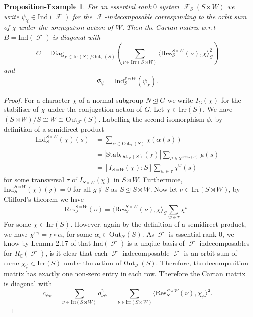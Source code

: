 \documentclass[12pt]{article}
\DeclareMathOperator{\C}{\mathbb{C}}
\DeclareMathOperator{\sF}{\mathcal{F}}
\theoremstyle{plain}
\newtheorem{prop-example}[thm]{Proposition-Example}
\theoremstyle{definition}
\begin{document}
\begin{prop-example}
For an essential rank $0$ system $\sF_S(S \rtimes W)$ we write $\psi_{\chi} \in \text{Ind}(\sF)$ for the $\sF$-indecomposable corresponding to the orbit sum of $\chi$ under the conjugation action of $W$. Then the Cartan matrix w.r.t $B = \text{Ind}(\sF)$ is diagonal with 
\[C = \mathrm{Diag}_{\chi \in \mathrm{Irr}(S)/\mathrm{Out}_{\sF}(S)}\left(\sum_{\nu \in \mathrm{Irr}(S \rtimes W)} \langle \mathrm{Res}^{S \rtimes W}_S(\nu), \chi \rangle_S^2\right)\] and
\[\Phi_{\psi} = 
\mathrm{Ind}_S^{S \rtimes W}(\psi_{\chi}).
\]
\end{prop-example}
\begin{proof}
For a character $\chi$ of a normal subgroup $N \trianglelefteq G$ we write $I_G(\chi)$ for the stabiliser of $\chi$ under the conjugation action of $G$. Let $\chi \in \mathrm{Irr}(S)$. We have $(S \rtimes W)/S \cong W \cong \mathrm{Out}_{\sF}(S)$. Labelling the second isomorphism $\phi$, by definition of a semidirect product \begin{align*}
\mathrm{Ind}_S^{S \rtimes W}(\chi)(s) &= \displaystyle\sum_{\alpha \in \mathrm{Out}_{\sF}(S)}\chi(\alpha(s)) 
\\ 
&= |\text{Stab}_{\mathrm{Out}_{\sF}(S)}(\chi)|\displaystyle\sum_{\mu \in \chi^{\mathrm{Out}_{\sF}(S)}}\mu(s)
\\
&= [I_{S \rtimes W}(\chi):S]\displaystyle\sum_{w \in \tau}\chi^{w}(s)
\end{align*} 
for some transversal $\tau$ of $I_{S \rtimes W}(\chi)$ in $S \rtimes W$. Furthermore, $\mathrm{Ind}_S^{S \rtimes W}(\chi)(g) = 0$ for all $g \not \in S$ as $S \trianglelefteq S \rtimes W$. Now let $\nu \in \mathrm{Irr}(S \rtimes W)$, by Clifford's theorem we have
\[\mathrm{Res}^{S \rtimes W}_S(\nu) = \langle \mathrm{Res}^{S \rtimes W}_S(\nu) , \chi\rangle_S\sum_{w \in \tau}^{} \chi^{w}.\]
For some $\chi \in \text{Irr}(S)$. However, again by the definition of a semidirect product, we have $\chi^{w_i} = \chi \circ \alpha_i$ for some $\alpha_i \in \mathrm{Out}_{\sF}(S)$. As $\sF$ is essential rank $0$, we know by Lemma 2.17 of \cite{unique factorisation} that $\text{Ind}(\sF)$ is a unqiue basis of $\sF$-indecomposables for $R_{\C}(\sF)$, is it clear that each $\sF$-indecomposable $\sF$ is an orbit sum of some $\chi_{\psi} \in \mathrm{Irr}(S)$ under the action of $\mathrm{Out}_{\sF}(S)$. 
Therefore, the decomposition matrix has exactly one non-zero entry in each row. Therefore the Cartan matrix is diagonal with 
\[c_{\psi\psi} = \displaystyle\sum_{\nu \in \mathrm{Irr}(S \rtimes W)} d_{\nu\psi}^2 = \sum_{\nu \in \mathrm{Irr}(S \rtimes W)} \langle \mathrm{Res}_S^{S \rtimes W}(\nu), \chi_{\psi}\rangle^2.\] 

\end{proof}
\end{document}
